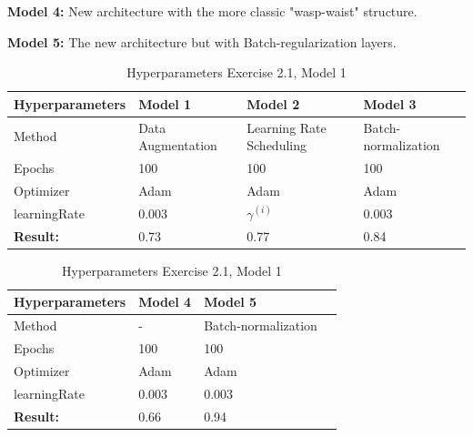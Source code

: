 \documentclass[a4paper,10pt]{article}
\begin{document}
\textbf{Model 4:} New architecture with the more classic "wasp-waist" structure. 

\textbf{Model 5:} The new architecture but with Batch-regularization layers.  


\begin{table}[ht!]
\centering
\begin{tabular}{llll}\hline 
 \textbf{Hyperparameters}& \textbf{Model 1}& \textbf{Model 2}& \textbf{Model 3} \\ \hline
 Method&  Data Augmentation&  Learning Rate Scheduling& Batch-normalization \\ 
 Epochs&  100&  100& 100 \\ 
 Optimizer& Adam& Adam& Adam \\
 learningRate& 0.003& $\gamma^{(i)}$& 0.003  \\ \hline
\textbf{Result: }& 0.73& 0.77&  0.84\\ \hline
\end{tabular}
\caption{Hyperparameters Exercise 2.1, Model 1}
\label{tab:tab8}
\end{table}

\begin{table}[ht!]
\centering
\begin{tabular}{llll}\hline 
 \textbf{Hyperparameters}& \textbf{Model 4}& \textbf{Model 5} \\ \hline
 Method&  - & Batch-normalization \\ 
 Epochs&  100&  100 \\ 
 Optimizer& Adam& Adam \\
 learningRate& 0.003&  0.003  \\ \hline
\textbf{Result: }& 0.66& 0.94 \\ \hline
\end{tabular}
\caption{Hyperparameters Exercise 2.1, Model 1}
\label{tab:tab8}
\end{table}
\end{document}
